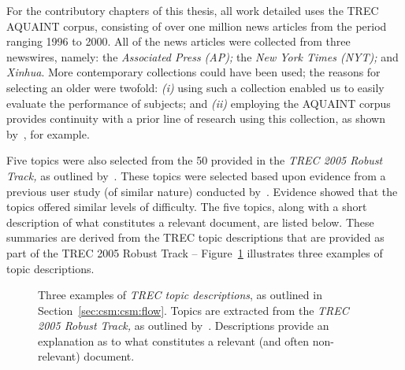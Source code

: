 For the contributory chapters of this thesis, all work detailed uses the TREC AQUAINT corpus, consisting of over one million news articles from the period ranging 1996 to 2000. All of the news articles were collected from three newswires, namely: the \emph{Associated Press (AP);} the \emph{New York Times (NYT);} and \emph{Xinhua}. More contemporary collections could have been used; the reasons for selecting an older were twofold: \emph{(i)} using such a collection enabled us to easily evaluate the performance of subjects; and \emph{(ii)} employing the AQUAINT corpus provides continuity with a prior line of research using this collection, as shown by~\cite{azzopardi2013query_cost}, for example.

Five topics were also selected from the 50 provided in the \emph{TREC 2005 Robust Track,} as outlined by~\cite{voorhees2006trec_robust}. These topics were selected based upon evidence from a previous user study (of similar nature) conducted by~\cite{kelly2015serp_size}. Evidence showed that the topics offered similar levels of difficulty. The five topics, along with a short description of what constitutes a relevant document, are listed below. These summaries are derived from the TREC topic descriptions that are provided as part of the TREC 2005 Robust Track -- Figure~\ref{fig:topics} illustrates three examples of topic descriptions.

\begin{figure}[t!]
    \centering
    \caption[Examples of TREC Topics]{Three examples of \emph{TREC topic descriptions}, as outlined in Section~\ref{sec:csm:csm:flow}. Topics are extracted from the \emph{TREC 2005 Robust Track,} as outlined by~\cite{voorhees2006trec_robust}. Descriptions provide an explanation as to what constitutes a relevant (and often non-relevant) document.}
    \label{fig:topics}
\end{figure}

